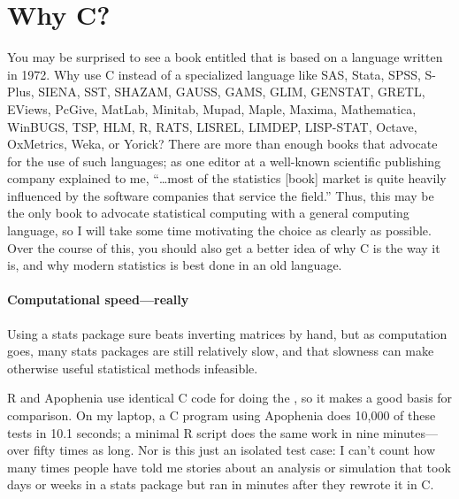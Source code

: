\section{Why C?}
You may be surprised to see a book entitled  that is based on a language written in 1972. 
Why use C instead of a specialized language like SAS, Stata, SPSS,
S-Plus, SIENA, SST, SHAZAM, GAUSS, GAMS, GLIM, GENSTAT, GRETL, EViews,
PcGive, MatLab, Minitab, Mupad, Maple, Maxima, Mathematica, WinBUGS, TSP,
HLM, R, RATS, LISREL, LIMDEP, LISP-STAT, Octave, OxMetrics, Weka, or Yorick?
There are more than enough books that advocate for the use of such
languages; as one editor at a well-known scientific publishing company
explained to me, ``\dots most of the statistics [book] market is quite
heavily influenced by the software companies that service the field.''
Thus, this may be the only book to advocate statistical computing with
a general computing language, so I will take some time motivating the
choice as clearly as possible. Over the course of this, you should also
get a better idea of why C is the way it is, and why modern statistics
is best done in an old language.

\paragraph{Computational speed---really} Using a stats package sure
beats inverting matrices by hand, but as computation goes, many stats
packages are still relatively slow, and that slowness can make otherwise
useful statistical methods infeasible.

R and Apophenia use identical C code for doing the , so it makes a good basis for comparison. On my laptop,
a C program using Apophenia does 10,000 of these tests in 10.1 seconds;
a minimal R script does the same work in nine minutes---over fifty times
as long. Nor is this just an isolated test case: I can't count how many
times people have told me stories about an analysis or simulation that
took days or weeks in a stats package but ran in minutes after they
rewrote it in C.

